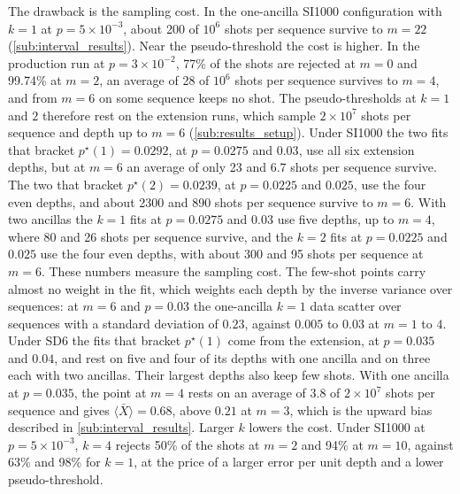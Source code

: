 The drawback is the sampling cost. In the one-ancilla SI1000 configuration with $k = 1$ at $p = 5\times10^{-3}$, about 200 of $10^6$ shots per sequence survive to $m = 22$ (\autoref{sub:interval_results}). Near the pseudo-threshold the cost is higher. In the production run at $p = 3\times10^{-2}$, 77\% of the shots are rejected at $m = 0$ and 99.74\% at $m = 2$, an average of 28 of $10^6$ shots per sequence survives to $m = 4$, and from $m = 6$ on some sequence keeps no shot. The pseudo-thresholds at $k = 1$ and $2$ therefore rest on the extension runs, which sample $2\times10^7$ shots per sequence and depth up to $m = 6$ (\autoref{sub:results_setup}).
Under SI1000 the two fits that bracket $p^\star(1) = 0.0292$, at $p = 0.0275$ and $0.03$, use all six extension depths, but at $m = 6$ an average of only 23 and 6.7 shots per sequence survive. The two that bracket $p^\star(2) = 0.0239$, at $p = 0.0225$ and $0.025$, use the four even depths, and about 2300 and 890 shots per sequence survive to $m = 6$. With two ancillas the $k = 1$ fits at $p = 0.0275$ and $0.03$ use five depths, up to $m = 4$, where 80 and 26 shots per sequence survive, and the $k = 2$ fits at $p = 0.0225$ and $0.025$ use the four even depths, with about 300 and 95 shots per sequence at $m = 6$. These numbers measure the sampling cost. The few-shot points carry almost no weight in the fit, which weights each depth by the inverse variance over sequences: at $m = 6$ and $p = 0.03$ the one-ancilla $k = 1$ data scatter over sequences with a standard deviation of $0.23$, against $0.005$ to $0.03$ at $m = 1$ to $4$.
Under SD6 the fits that bracket $p^\star(1)$ come from the extension, at $p = 0.035$ and $0.04$, and rest on five and four of its depths with one ancilla and on three each with two ancillas. Their largest depths also keep few shots. With one ancilla at $p = 0.035$, the point at $m = 4$ rests on an average of 3.8 of $2\times10^7$ shots per sequence and gives $\langle \bar{X} \rangle = 0.68$, above $0.21$ at $m = 3$, which is the upward bias described in \autoref{sub:interval_results}. Larger $k$ lowers the cost. Under SI1000 at $p = 5\times10^{-3}$, $k = 4$ rejects 50\% of the shots at $m = 2$ and 94\% at $m = 10$, against 63\% and 98\% for $k = 1$, at the price of a larger error per unit depth and a lower pseudo-threshold.

